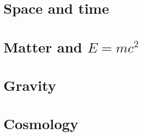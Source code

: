 \documentclass{poets}
\begin{document}


\cleardoublepage





\tableofcontents

\mainmatter
  \addtocounter{page}{8}  %
\newcommand{\dochapter}[1]{\renewcommand{\chapdir}{ch#1}}
\part{Space and time}
    \dochapter{01}
    \dochapter{02}
    \dochapter{03}
    \dochapter{04}
\part{Matter and \boldmath $E=mc^2$}
    \dochapter{05}
    \dochapter{06}
\part{Gravity}
    \dochapter{07}
    \dochapter{08}
    \dochapter{09}
    \dochapter{10}
    \dochapter{11}
    \dochapter{12}
\part{Cosmology}
    \dochapter{13}
    \dochapter{14}



\backmatter



\printindex
\end{document}
